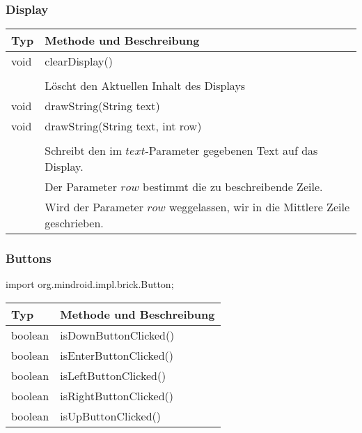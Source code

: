 	\subsubsection{Display}
		\begin{table}[htbp]
		\begin{tabular}{|p{} p{}|}
		\hline
		\textbf{Typ} & \textbf{Methode und Beschreibung} \\ \hline
		void & clearDisplay() \\ 
		&\\
		& Löscht den Aktuellen Inhalt des Displays \\ \hline
		void & drawString(String text)\\			
		void & drawString(String text, int row)\\
		&\\
		& Schreibt den im $text$-Parameter gegebenen Text auf das Display.\\
		& Der Parameter $row$ bestimmt die zu beschreibende Zeile. \\
		& Wird der Parameter $row$ weggelassen, wir in die Mittlere Zeile geschrieben. \\
		\hline

		\end{tabular}
		\end{table}
		

	\newpage
	\subsubsection{Buttons}
							\begin{center}import org.mindroid.impl.brick.Button;\end{center}
		\begin{table}[htbp]
		\begin{tabular}{|p{} p{}|}
		\hline
		\textbf{Typ} & \textbf{Methode und Beschreibung} \\ \hline
		boolean & isDownButtonClicked() \\ 
		boolean & isEnterButtonClicked() \\ 
		boolean & isLeftButtonClicked() \\ 
		boolean & isRightButtonClicked() \\ 
		boolean & isUpButtonClicked() \\ \hline
		\end{tabular}
		\end{table}

